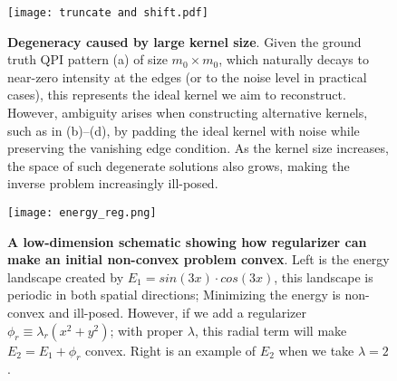 \begin{figure}
	\texttt{[image: truncate and shift.pdf]} 
	\centering
	\caption[\textbf{Degeneracy caused by large kernel size}]{\textbf{Degeneracy caused by large kernel size}. Given the ground truth QPI pattern (a) of size $m_0 \times m_0$, which naturally decays to near-zero intensity at the edges (or to the noise level in practical cases), this represents the ideal kernel we aim to reconstruct. However, ambiguity arises when constructing alternative kernels, such as in (b)–(d), by padding the ideal kernel with noise while preserving the vanishing edge condition. As the kernel size increases, the space of such degenerate solutions also grows, making the inverse problem increasingly ill-posed.}
	\label{fig:ch6_t&s}
\end{figure}

\begin{figure}
	\texttt{[image: energy\_reg.png]} 
	\centering
	\caption[\textbf{A low-dimension schematic showing how regularizer can make an initial non-convex problem convex}]{\textbf{A low-dimension schematic showing how regularizer can make an initial non-convex problem convex}. Left is the energy landscape created by $E_1 = sin(3x)\cdot cos(3x)$, this landscape is periodic in both spatial directions; Minimizing the energy is non-convex and ill-posed. However, if we add a regularizer $\phi_r \equiv \lambda_r(x^2 + y^2)$; with proper $\lambda$, this radial term will make $E_2 = E_1 + \phi_r$ convex. Right is an example of $E_2$ when we take $\lambda=2$.}
	\label{fig:ch6_reg}
\end{figure}

